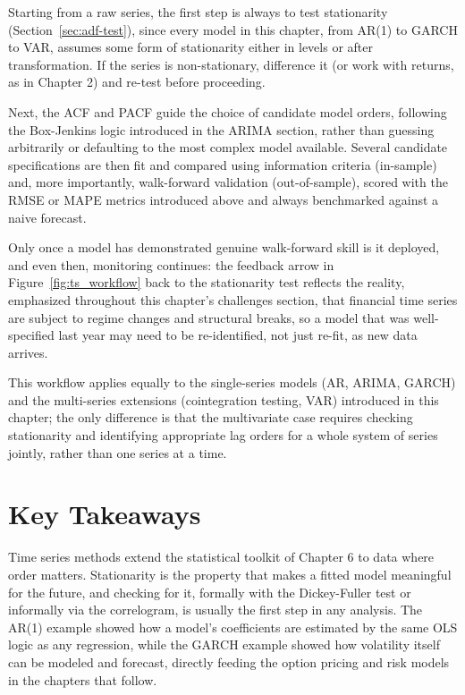 \documentclass[../ai_in_finance]{subfiles}
\begin{document}
Starting from a raw series, the first step is always to test stationarity (Section~\ref{sec:adf-test}), since every model in this chapter, from AR(1) to GARCH to VAR, assumes some form of stationarity either in levels or after transformation. If the series is non-stationary, difference it (or work with returns, as in Chapter 2) and re-test before proceeding.

Next, the ACF and PACF guide the choice of candidate model orders, following the Box-Jenkins logic introduced in the ARIMA section, rather than guessing arbitrarily or defaulting to the most complex model available. Several candidate specifications are then fit and compared using information criteria (in-sample) and, more importantly, walk-forward validation (out-of-sample), scored with the RMSE or MAPE metrics introduced above and always benchmarked against a naive forecast.

Only once a model has demonstrated genuine walk-forward skill is it deployed, and even then, monitoring continues: the feedback arrow in Figure~\ref{fig:ts_workflow} back to the stationarity test reflects the reality, emphasized throughout this chapter's challenges section, that financial time series are subject to regime changes and structural breaks, so a model that was well-specified last year may need to be re-identified, not just re-fit, as new data arrives.

This workflow applies equally to the single-series models (AR, ARIMA, GARCH) and the multi-series extensions (cointegration testing, VAR) introduced in this chapter; the only difference is that the multivariate case requires checking stationarity and identifying appropriate lag orders for a whole system of series jointly, rather than one series at a time.

\section{Key Takeaways}

Time series methods extend the statistical toolkit of Chapter 6 to data where order matters. Stationarity is the property that makes a fitted model meaningful for the future, and checking for it, formally with the Dickey-Fuller test or informally via the correlogram, is usually the first step in any analysis. The AR(1) example showed how a model's coefficients are estimated by the same OLS logic as any regression, while the GARCH example showed how volatility itself can be modeled and forecast, directly feeding the option pricing and risk models in the chapters that follow.
\end{document}
